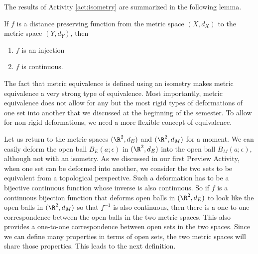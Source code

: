 The results of Activity \ref{act:isometry} are summarized in the following lemma.



\begin{lemma} If $f$ is a distance preserving function from the metric space $(X,d_X)$ to the metric space $(Y,d_Y)$, then 
\begin{enumerate}
\item $f$ is an injection
\item $f$ is continuous.
\end{enumerate}
\end{lemma}


\begin{comment}
\begin{proof} Let $f$ be an isometry from the metric space $(X,d_X)$ to the metric space $(Y,d_Y)$. We first prove that $f$ is an injection. Let $a_1, a_2 \in X$ and assume $f(a_1) = f(a_2)$. Then 
\[0 = d_Y(f(a_1),f(a_2)) = d_X(a_1,a_2),\]
which implies $a=b$. Thus, $f$ is an injection.

Now we prove that $f$ is continuous. Let $a \in X$, and let $\epsilon > 0$ be given. Let $\delta = \epsilon$. If $x \in X$ so that $d_X(x,a) < \delta$, then
\[d_Y(f(x), f(a)) = d_X(x,a) < \delta = \epsilon.\]
Therefore, $f$ is a continuous function from $X$ to $Y$. 
\end{proof}
\end{comment}


\label{sec_top_equiv}
 
The fact that metric equivalence is defined using an isometry makes metric equivalence a very strong type of equivalence. Most importantly, metric equivalence does not allow for any but the most rigid types of deformations of one set into another that we discussed at the beginning of the semester. To allow for non-rigid deformations, we need a more flexible concept of equivalence. 

Let us return to the metric spaces $(\R^2, d_E)$ and $(\R^2, d_M)$ for a moment. We can easily deform the open ball $B_E(a; \epsilon)$ in $(\R^2, d_E)$ into the open ball $B_M(a; \epsilon)$, although not with an isometry. As we discussed in our first Preview Activity, when one set can be deformed into another, we consider the two sets to be equivalent from a topological perspective. Such a deformation has to be a bijective continuous function whose inverse is also continuous. So if $f$ is a continuous bijection function that deforms open balls in $(\R^2, d_E)$ to look like the open balls in $(\R^2, d_M)$ so that $f^{-1}$ is also continuous, then there is a one-to-one correspondence between the open balls in the two metric spaces. This also provides a one-to-one correspondence between open sets in the two spaces. Since we can define many properties in terms of open sets, the two metric spaces will share those properties. This leads to the next definition.



